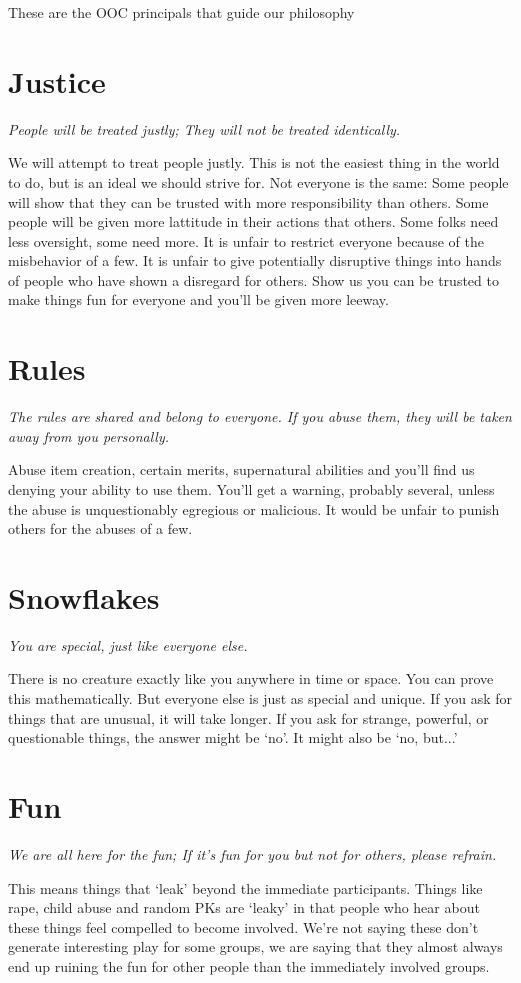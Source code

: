 These are the OOC principals that guide our philosophy
\section{Justice}
{\em People will be treated justly; They will not be treated identically.}

We will attempt to treat people justly.
This is not the easiest thing in the world to do, but is an ideal we should strive for.
Not everyone is the same:
Some people will show that they can be trusted with more responsibility than others.
Some people will be given more lattitude in their actions that others.
Some folks need less oversight, some need more.
It is unfair to restrict everyone because of the misbehavior of a few.
It is unfair to give potentially disruptive things into hands of people who have shown a disregard for others.
Show us you can be trusted to make things fun for everyone and you'll be given more leeway.
\section{Rules}
{\em The rules are shared and belong to everyone.
If you abuse them, they will be taken away from you personally.}

Abuse item creation, certain merits, supernatural abilities and you'll find us denying your ability to use them.
You'll get a warning, probably several, unless the abuse is unquestionably egregious or malicious.
It would be unfair to punish others for the abuses of a few.
\section{Snowflakes}
{\em You are special, just like everyone else.}

There is no creature exactly like you anywhere in time or space.
You can prove this mathematically.
But everyone else is just as special and unique.
If you ask for things that are unusual, it will take longer.
If you ask for strange, powerful, or questionable things, the answer might be `no'.
It might also be `no, but...'
\section{Fun}
{\em We are all here for the fun; If it's fun for you but not for others, please refrain.}

This means things that `leak' beyond the immediate participants.
Things like rape, child abuse and random PKs are `leaky' in that people who hear about these things feel compelled to become involved.
We're not saying these don't generate interesting play for some groups, we are saying that they almost always end up ruining the fun for other people than the immediately involved groups.
